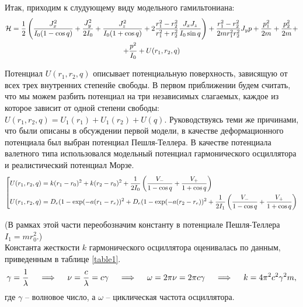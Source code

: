 Итак, приходим к слудующему виду модельного гамильтониана:
\begin{gather}
\mathcal{H} = \frac{1}{2} \left( \frac{J_x^2}{I_0 (1 - \cos q)} + \frac{J_y^2}{2 I_0} + \frac{J_z^2}{I_0 (1 + \cos q)} + 2 \frac{r_1^2 - r_2^2}{r_1^2 + r_2^2} \frac{J_x J_z}{I_0 \sin q} \right) + \frac{r_1^2 - r_2^2}{2m r_1^2 r_2^2} J_y p + \frac{p_1^2}{2m} + \frac{p_2^2}{2m} + \notag \\
+ \frac{p^2}{I_0} + U (r_1, r_2, q) \label{model_ham2}
\end{gather}

Потенциал $U(r_1, r_2, q)$ описывает потенциальную поверхность, зависящую от всех трех внутренних степенйе свободы. В первом приближении будем считать, что мы можем разбить потенциал на три независимых слагаемых, каждое из которое зависит от одной степени свободы: $U(r_1, r_2, q) = U_1 (r_1) + U_1 (r_2) + U (q)$. 
Руководствуясь теми же причинами, что были описаны в обсуждении первой модели, в качестве деформационного потенциала был выбран потенциал Пешля-Теллера. В качестве потенциала валетного типа использовался модельный потенциал гармонического осциллятора и реалистический потенциал Морзе. 
\vverh
\begin{gather}
\left[
\begin{aligned}
U(r_1, r_2, q) &= k (r_1 - r_0)^2 + k (r_2 - r_0)^2 + \frac{1}{2 I_0} \left( \frac{\displaystyle V_{-}}{\displaystyle 1 - \cos q} + \frac{\displaystyle V_{+}}{\displaystyle 1 + \cos q} \right) \\
U(r_1, r_2, q) &= D_e (1 - \exp (- a (r_1 - r_e))^2 + D_e (1 - \exp (- a (r_2 - r_e))^2 + \frac{1}{2 I_1} \left( \frac{\displaystyle V_{-}}{\displaystyle 1 - \cos q} + \frac{\displaystyle V_{+}}{\displaystyle 1 + \cos q} \right) 
\end{aligned}
\right. \notag
\end{gather}

(В рамках этой части переобозначим константу в потенциале Пешля-Теллера $I_1 = m r_0^2$.) \\
Константа жесткости $k$ гармонического осциллятора оценивалась по данным, приведенным в таблице \eqref{table1}. 
\vverh
\begin{gather}
\gamma = \frac{1}{\lambda} \quad \implies \quad 
\nu = \frac{c}{\lambda} = c \gamma \quad \implies \quad
\omega = 2 \pi \nu = 2 \pi c \gamma \quad \implies \quad
k = 4 \pi^2 c^2 \gamma^2 m , \notag 
\end{gather}
где $\gamma$ -- волновое число, а $\omega$ -- циклическая частота осциллятора.

